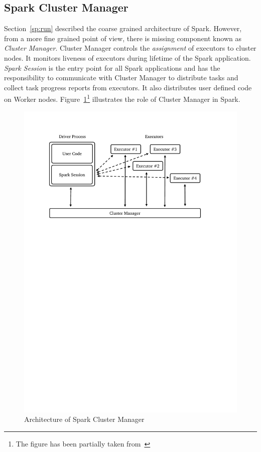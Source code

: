 \subsection{Spark Cluster Manager}
\label{sp:cluster}

Section~\ref{sp:run} described the coarse grained architecture of Spark. However, from a more fine grained point of view, there is missing component known as \emph{Cluster Manager}. Cluster Manager controls the \emph{assignment} of executors to cluster nodes. It monitors liveness of executors during lifetime of the Spark application. \emph{Spark Session} is the entry point for all Spark applications and has the responsibility to communicate with Cluster Manager to distribute tasks and collect task progress reports from executors. It also distributes user defined code on Worker nodes. Figure~\ref{fig:spark-cluster}\footnote{The figure has been partially taken from~\textcite{spark-guide}} illustrates the role of Cluster Manager in Spark.
\begin{figure}[h]
    \centering
    \includegraphics[clip,trim=2.4cm 19cm 3.5cm 2cm]{spark-cluster.pdf}
    \caption[Architecture of Spark Cluster Manager]{Architecture of Spark Cluster Manager}
    \label{fig:spark-cluster}
\end{figure}

